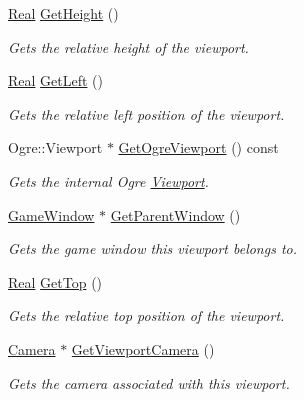 \begin{DoxyCompactItemize}
\hyperlink{namespacephys_af7eb897198d265b8e868f45240230d5f}{Real} \hyperlink{classphys_1_1Viewport_ae1a6473f3ccdac16535f985453caf691}{GetHeight} ()
\begin{DoxyCompactList}\small\item\em Gets the relative height of the viewport. \item\end{DoxyCompactList}\item 
\hyperlink{namespacephys_af7eb897198d265b8e868f45240230d5f}{Real} \hyperlink{classphys_1_1Viewport_a9a5667cbbb1127a89e4702219fe44c7a}{GetLeft} ()
\begin{DoxyCompactList}\small\item\em Gets the relative left position of the viewport. \item\end{DoxyCompactList}\item 
Ogre::Viewport $\ast$ \hyperlink{classphys_1_1Viewport_a005b39a37464c4f4a365c2bdb08ffb04}{GetOgreViewport} () const 
\begin{DoxyCompactList}\small\item\em Gets the internal Ogre \hyperlink{classphys_1_1Viewport}{Viewport}. \item\end{DoxyCompactList}\item 
\hyperlink{classphys_1_1GameWindow}{GameWindow} $\ast$ \hyperlink{classphys_1_1Viewport_ac350d4c2e790edd488b212ccb6b20991}{GetParentWindow} ()
\begin{DoxyCompactList}\small\item\em Gets the game window this viewport belongs to. \item\end{DoxyCompactList}\item 
\hyperlink{namespacephys_af7eb897198d265b8e868f45240230d5f}{Real} \hyperlink{classphys_1_1Viewport_af5d0413ab59dcd7bd428d73762a239e4}{GetTop} ()
\begin{DoxyCompactList}\small\item\em Gets the relative top position of the viewport. \item\end{DoxyCompactList}\item 
\hyperlink{classphys_1_1Camera}{Camera} $\ast$ \hyperlink{classphys_1_1Viewport_a755f7ede5f6552ef8b64d75f745b7957}{GetViewportCamera} ()
\begin{DoxyCompactList}\small\item\em Gets the camera associated with this viewport. \item\end{DoxyCompactList}\item 

\end{DoxyCompactItemize}
